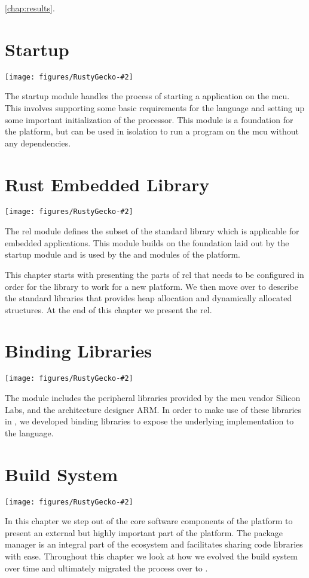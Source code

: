 
\autoref{chap:results}.

\newcommand{\corechapter}[3]{
  \chapter{#1}
  \label{chap:#2}
  \begin{center}
    \texttt{[image: figures/RustyGecko-\#2]}
  \end{center}
  \hfill \break
  \hfill \break
  \hfill \break
#3
}

\corechapter{Startup}{startup}{%
The startup module handles the process of starting a {\rust} application on the \glsdesc{mcu}.
This involves supporting some basic requirements for the language and setting up some important initialization of the processor.
This module is a foundation for the {\rg} platform, but can be used in isolation to run a program on the \gls{mcu} without any dependencies.
}


\corechapter{Rust Embedded Library}{rel}{%
The \glsdesc{rel} module defines the subset of the standard {\rust} library which is applicable for embedded applications.
This module builds on the foundation laid out by the startup module and is used by the \lib{bindings} and \lib{Application Layer} modules of the {\rg} platform.

This chapter starts with presenting the parts of \gls{rcl} that needs to be configured in order for the library to work for a new platform.
We then move over to describe the standard {\rust} libraries that provides heap allocation and dynamically allocated structures.
At the end of this chapter we present the \gls{rel}.
}



\corechapter{Binding Libraries}{bindings}{%
The  module includes the peripheral libraries provided by the \gls{mcu} vendor Silicon Labs, and the architecture designer ARM.
In order to make use of these libraries in {\rust}, we developed binding libraries to expose the underlying {\C} implementation to the {\rust} language.
}




\corechapter{Build System}{build}{%
In this chapter we step out of the core software components of the {\rg} platform to present an external but highly important part of the {\rg} platform.
The {\cargo} package manager is an integral part of the {\rust} ecosystem and facilitates sharing code libraries with ease.
Throughout this chapter we look at how we evolved the build system over time and ultimately migrated the process over to {\cargo}.
}


